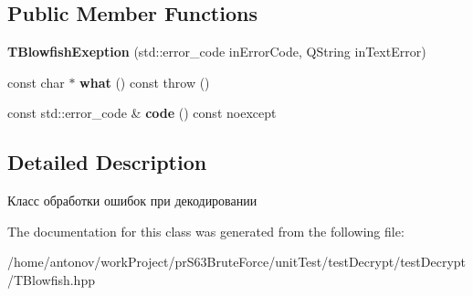 \subsection*{Public Member Functions}
\begin{DoxyCompactItemize}
\item 
\mbox{\label{classunit_test_1_1blowfish_exeption_1_1_t_blowfish_exeption_a43f1577e2e9a0968e3ddd1e8ebf63149}} 
{\bfseries T\+Blowfish\+Exeption} (std\+::error\+\_\+code in\+Error\+Code, Q\+String in\+Text\+Error)
\item 
\mbox{\label{classunit_test_1_1blowfish_exeption_1_1_t_blowfish_exeption_a610e3b316bd4d1acc93376c621e44140}} 
const char $\ast$ {\bfseries what} () const  throw ()
\item 
\mbox{\label{classunit_test_1_1blowfish_exeption_1_1_t_blowfish_exeption_ab724eefef2fae1ccda9a35607779f045}} 
const std\+::error\+\_\+code \& {\bfseries code} () const noexcept
\end{DoxyCompactItemize}


\subsection{Detailed Description}
Класс обработки ошибок при декодировании 

The documentation for this class was generated from the following file\+:\begin{DoxyCompactItemize}
\item 
/home/antonov/work\+Project/pr\+S63\+Brute\+Force/unit\+Test/test\+Decrypt/test\+Decrypt/T\+Blowfish.\+hpp\end{DoxyCompactItemize}
